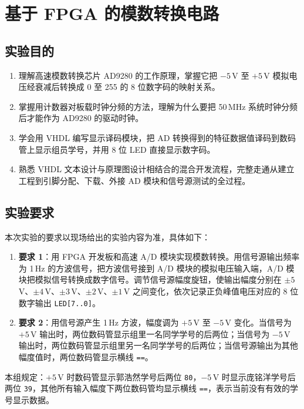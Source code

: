 \documentclass{ctexrep}
\begin{document}
\graphicspath{{../7. adda2/figures/}}
\chapter{基于 FPGA 的模数转换电路}

\section{实验目的}

\begin{enumerate}
    \item 理解高速模数转换芯片 AD9280 的工作原理，掌握它把 $-5\,$V 至 $+5\,$V 模拟电压经衰减后转换成 0 至 255 的 8 位数字码的映射关系。
    \item 掌握用计数器对板载时钟分频的方法，理解为什么要把 50\,MHz 系统时钟分频后才能作为 AD9280 的驱动时钟。
    \item 学会用 VHDL 编写显示译码模块，把 AD 转换得到的特征数据值译码到数码管上显示组员学号，并用 8 位 LED 直接显示数字码。
    \item 熟悉 VHDL 文本设计与原理图设计相结合的混合开发流程，完整走通从建立工程到引脚分配、下载、外接 AD 模块和信号源测试的全过程。
\end{enumerate}

\section{实验要求}

本次实验的要求以现场给出的实验内容为准，具体如下：

\begin{enumerate}
    \item \textbf{要求 1}：用 FPGA 开发板和高速 A/D 模块实现模数转换。用信号源输出频率为 1\,Hz 的方波信号，把方波信号接到 A/D 模块的模拟电压输入端，A/D 模块把模拟信号转换成数字信号。调节信号源幅度旋钮，使输出幅度分别在 $\pm5\,$V、$\pm4\,$V、$\pm3\,$V、$\pm2\,$V、$\pm1\,$V 之间变化，依次记录正负峰值电压对应的 8 位数字输出 \texttt{LED[7..0]}。
    \item \textbf{要求 2}：用信号源产生 1\,Hz 方波，幅度调为 $+5\,$V 至 $-5\,$V 变化。当信号为 $+5\,$V 输出时，两位数码管显示组里一名同学学号的后两位；当信号为 $-5\,$V 输出时，两位数码管显示组里另一名同学学号的后两位；当信号源输出为其他幅度值时，两位数码管显示横线 \texttt{==}。
\end{enumerate}

本组规定：$+5\,$V 时数码管显示郭浩然学号后两位 \texttt{80}，$-5\,$V 时显示庞铭洋学号后两位 \texttt{39}，其他所有输入幅度下两位数码管均显示横线 \texttt{==}，表示当前没有有效的学号显示数据。
\end{document}
